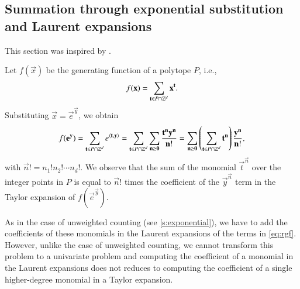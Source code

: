 \subsection{Summation through exponential substitution and Laurent expansions}
\label{s:laurent}

This section was inspired by .

Let $f(\vec x)$ be the generating function of a polytope $P$,
i.e.,
$$
f(\vec x) = \sum_{\vec t \in P \cap \ZZ^d} \vec x^{\vec t}
.
$$
Substituting $\vec x = \vec e^{\vec y}$, we obtain
$$
f(\vec e^{\vec y}) = \sum_{\vec t \in P \cap \ZZ^d} e^{\sp t y}
=
\sum_{\vec t \in P \cap \ZZ^d}
    \sum_{\vec n \ge \vec 0} \frac{\vec t^{\vec n} \vec y^{\vec n}}{\vec n!}
=
\sum_{\vec n \ge \vec 0}
    \left(\sum_{\vec t \in P \cap \ZZ^d} \vec t^{\vec n}\right)
	\frac{\vec y^{\vec n}}{\vec n!}
,
$$
with $\vec n! = n_1! n_2! \cdots n_d!$.
We observe that the sum of the monomial $\vec t^{\vec n}$
over the integer points in $P$ is equal to $\vec n!$ times the coefficient
of the $\vec y^{\vec n}$ term in the Taylor expansion of $f(\vec e^{\vec y})$.

As in the case of unweighted counting (see \autoref{s:exponential}),
we have to add the coefficients
of these monomials in the Laurent expansions of the terms in \eqref{eq:rgf}.
However, unlike the case of unweighted counting, we cannot transform
this problem to a univariate problem and computing the coefficient
of a monomial in the Laurent expansions does not reduces to computing
the coefficient of a single higher-degree monomial in a Taylor expansion.

